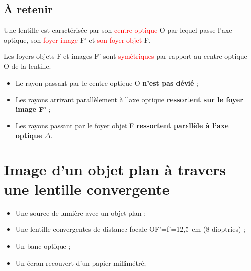 \subsection{\`{A} retenir}

\begin{multicols}{2}
\begin{tcolorbox}[colback=green!5!white,colframe=green!75!black,title=\textbf{Lentille convergente :}]  
    Une lentille est caractérisée par son \textcolor{red}{centre optique} O par lequel passe l'axe optique, son \textcolor{red}{foyer image} F' et \textcolor{red}{son foyer objet} F.
\end{tcolorbox}
\begin{tcolorbox}[colback=red!5!white,colframe=red!75!black,title=\textbf{Propriété sur F et F' :}]
Les foyers objets F et images F' sont \textcolor{red}{symétriques} par rapport au centre optique O de la lentille.
\end{tcolorbox}

\end{multicols}
    \begin{tcolorbox}[colback=red!5!white,colframe=red!75!black,title=\textbf{Règles de construction d'une image par une lentille :}]
\begin{itemize}
    \item Le rayon passant par le centre optique O \textbf{n'est pas dévié} ;
    \item Les rayons arrivant parallèlement à l'axe optique \textbf{ressortent sur le foyer image F'} ;
    \item Les rayons passant par le foyer objet F \textbf{ressortent parallèle à l'axe optique $\Delta$}.
\end{itemize}
\end{tcolorbox}
\newpage
\section{Image d'un objet plan à travers une lentille convergente}
\setcounter{exercice}{0}

\begin{mdframed}[style=autreexo]
\textbf{}
\vspace{-0.5cm}
\begin{multicols}{2}
\begin{itemize}
    \item Une source de lumière avec un objet plan ;
    \item Une lentille convergentes de distance focale OF'=f'=12,5~cm (8 dioptries) ;
    \item Un banc optique ;
    \item Un écran recouvert d'un papier millimétré;
\end{itemize}
\end{multicols}
\end{mdframed}

